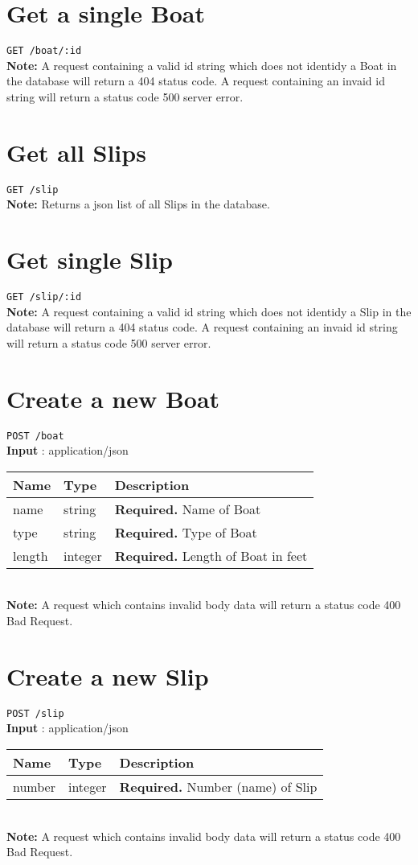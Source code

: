 \documentclass{article}
\begin{document}
\section*{Get a single Boat}
\texttt{GET /boat/:id} \\
\textbf{Note:} A request containing a valid id string which does not
identidy a Boat in the database will return a 404 status code. A request
containing an invaid id string will return a status code 500 server error.

\section*{Get all Slips}
\texttt{GET /slip} \\
\textbf{Note:} Returns a json list of all Slips in the database.

\section*{Get single Slip}
\texttt{GET /slip/:id} \\
\textbf{Note:} A request containing a valid id string which does not
identidy a Slip in the database will return a 404 status code. A request
containing an invaid id string will return a status code 500 server error.

\section*{Create a new Boat}
\texttt{POST /boat} \\
\textbf{Input} : application/json \\
\begin{tabular}{| l | l | l |}
	\hline
	\textbf{Name} & \textbf{Type} & \textbf{Description} \\
	\hline
	name          & string        & \textbf{Required.} Name of Boat \\
	\hline
	type          & string        & \textbf{Required.} Type of Boat \\
	\hline
	length        & integer       & \textbf{Required.} Length of Boat in feet \\
	\hline
\end{tabular} \\
\textbf{Note:} A request which contains invalid body data will return a
status code 400 Bad Request.

\section*{Create a new Slip}
\texttt{POST /slip} \\
\textbf{Input} : application/json \\
\begin{tabular}{| l | l | l |}
	\hline
	\textbf{Name} & \textbf{Type} & \textbf{Description} \\
	\hline
	number        & integer        & \textbf{Required.} Number (name) of Slip \\
	\hline
\end{tabular} \\
\textbf{Note:} A request which contains invalid body data will return a
status code 400 Bad Request.
\end{document}
